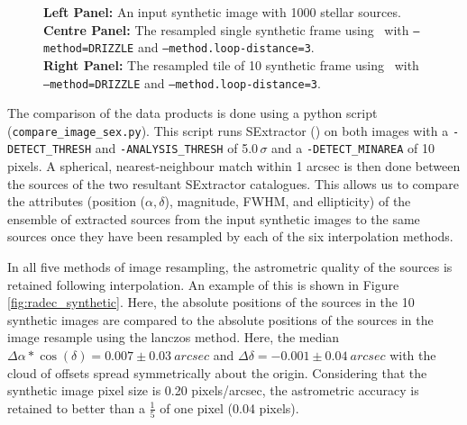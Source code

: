 \begin{figure}[H]
\caption[]
	{\footnotesize  {\bf Left Panel:}  An input synthetic image with 1000 stellar sources.\\
	{\bf Centre Panel:}  The resampled single synthetic frame using \hdrlresample\ with {\tt --method=DRIZZLE} and {\tt --method.loop-distance=3}.\\
	{\bf Right Panel:}  The resampled tile of 10 synthetic frame using \hdrlresample\ with {\tt --method=DRIZZLE} and {\tt --method.loop-distance=3}.
	}
	\label{fig:synthetic_image}
\end{figure}


The comparison of the data products is done using a python script ({\tt compare\_image\_sex.py}).  This script runs SExtractor (\cite{bertin})
on both images with a {\tt -DETECT\_THRESH} and {\tt -ANALYSIS\_THRESH} of 5.0\,$\sigma$ and a {\tt -DETECT\_MINAREA} of 10 pixels.
A spherical, nearest-neighbour match within 1 arcsec is then done between the sources of the two resultant SExtractor catalogues.
This allows us to compare the attributes (position ($\alpha, \delta$), magnitude, FWHM, and ellipticity) of the ensemble of extracted sources
from the input synthetic images to the same sources once they have been resampled by each of the six interpolation methods.

In all five methods of image resampling, the astrometric quality of the sources is retained following interpolation.  An example of this is shown in 
Figure \ref{fig:radec_synthetic}.  Here, the absolute positions of the sources in the 10 synthetic images are compared to the absolute positions
of the sources in the image resample using the lanczos method.   Here, the median $\Delta\alpha*\cos(\delta)=0.007\pm0.03\ arcsec$ and 
$\Delta\delta=-0.001\pm0.04\ arcsec$ with the cloud of offsets spread symmetrically about the origin.  
Considering that the synthetic image pixel size is 0.20 pixels/arcsec, the astrometric accuracy is retained to better than a $\frac{1}{5}$ of one pixel (0.04 pixels).

